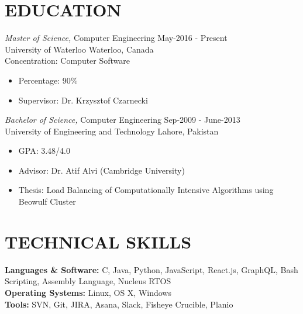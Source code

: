 \documentclass[margin, 10pt]{res} %
\begin{document}
\begin{resume}

\section{EDUCATION}

{\sl Master of Science,} Computer Engineering \hfill May-2016 - Present \\
University of Waterloo \hfill Waterloo, Canada \\
Concentration: Computer Software

\begin{itemize} \itemsep -2pt %
\item Percentage: 90\% 
\item Supervisor: Dr. Krzysztof Czarnecki
\end{itemize}

{\sl Bachelor of Science,} Computer Engineering \hfill Sep-2009 - June-2013 \\
University of Engineering and Technology \hfill Lahore, Pakistan

\begin{itemize} \itemsep -2pt %
\item GPA: 3.48/4.0
\item Advisor: Dr. Atif Alvi (Cambridge University) 
\item Thesis: Load Balancing of Computationally Intensive Algorithms using Beowulf Cluster

\end{itemize}
 

\section{TECHNICAL SKILLS} 


\textbf{Languages \& Software:}
C, Java, Python, JavaScript, React.js, GraphQL, Bash Scripting, Assembly Language, Nucleus RTOS\\
\textbf{Operating Systems:} Linux, OS X, Windows\\
\textbf{Tools:} SVN, Git, JIRA, Asana, Slack, Fisheye Crucible, Planio


\end{resume}
\end{document}
